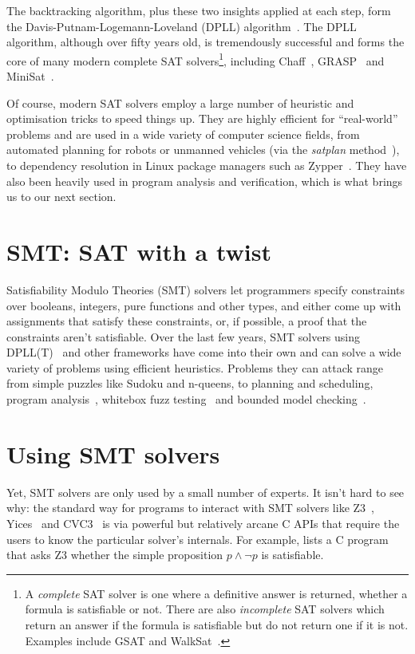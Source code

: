 The backtracking algorithm, plus these two insights applied at each step, form
the Davis-Putnam-Logemann-Loveland (DPLL) algorithm~\cite{dpll1,dpll2}. The
DPLL algorithm, although over fifty years old, is tremendously successful and
forms the core of many modern complete SAT solvers\footnote{A
\textit{complete} SAT solver is one where a definitive answer is returned,
whether a formula is satisfiable or not. There are also \textit{incomplete}
SAT solvers which return an answer if the formula is satisfiable but do not
return one if it is not. Examples include GSAT and WalkSat~\cite{walksat}.},
including Chaff~\cite{chaff}, GRASP~\cite{grasp} and MiniSat~\cite{minisat}.

Of course, modern SAT solvers employ a large number of heuristic and
optimisation tricks to speed things up. They are highly efficient for
``real-world'' problems and are used in a wide variety of computer science fields,
from automated planning for robots or unmanned vehicles (via the
\textit{satplan} method~\cite{satplan}), to dependency resolution in Linux
package managers such as Zypper~\cite{zypper}. They have also been heavily used in 
program analysis and verification, which is what brings us to our next section.

\section{SMT: SAT with a twist}



Satisfiability Modulo Theories (SMT) solvers let programmers specify constraints
over booleans, integers, pure functions and other types, and either come up
with assignments that satisfy these constraints, or, if possible, a proof that
the constraints aren't satisfiable. Over the last few years, SMT solvers using
DPLL(T)~\cite{dpllt:04} and other frameworks have come into their own and can
solve a wide variety of problems using efficient heuristics. Problems they can
attack range from simple puzzles like Sudoku and n-queens, to planning and
scheduling, program analysis~\cite{Gulwani:08}, whitebox fuzz
testing~\cite{Godefroid:08} and bounded model checking~\cite{Armando:09}.

\section{Using SMT solvers}
\label{sec:usingsmt}

Yet, SMT solvers are only used by a small number of experts. It isn't hard to
see why: the standard way for programs to interact with SMT solvers like
Z3~\cite{z3}, Yices~\cite{yices} and CVC3~\cite{cvc3} is via powerful but
relatively arcane C APIs that require the users to know the particular
solver's internals. For example,  lists a C program that
asks Z3 whether the simple proposition $p \wedge \neg p$ is satisfiable.

